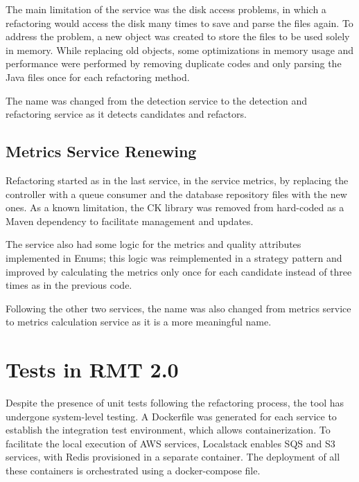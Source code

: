 The main limitation of the service was the disk access problems, in which a refactoring would access the disk many times to save and parse the files again. To address the problem, a new object was created to store the files to be used solely in memory. While replacing old objects, some optimizations in memory usage and performance were performed by removing duplicate codes and only parsing the Java files once for each refactoring method.

The name was changed from the detection service to the detection and refactoring service as it detects candidates and refactors.



\subsection{Metrics Service Renewing}
\label{sec-restruct-metrics}

Refactoring started as in the last service, in the service metrics, by replacing the controller with a queue consumer and the database repository files with the new ones. As a known limitation, the CK library \textcite{ck} was removed from hard-coded as a Maven dependency to facilitate management and updates. 

The service also had some logic for the metrics and quality attributes implemented in Enums; this logic was reimplemented in a strategy pattern and improved by calculating the metrics only once for each candidate instead of three times as in the previous code.

Following the other two services, the name was also changed from metrics service to metrics calculation service as it is a more meaningful name. 


\section{Tests in RMT 2.0}
\label{sec-test-rmt}

Despite the presence of unit tests following the refactoring process, the tool has undergone system-level testing. A Dockerfile was generated for each service to establish the integration test environment, which allows containerization. To facilitate the local execution of AWS services, Localstack \cite{localstack} enables SQS and S3 services, with Redis provisioned in a separate container. The deployment of all these containers is orchestrated using a docker-compose file. 

